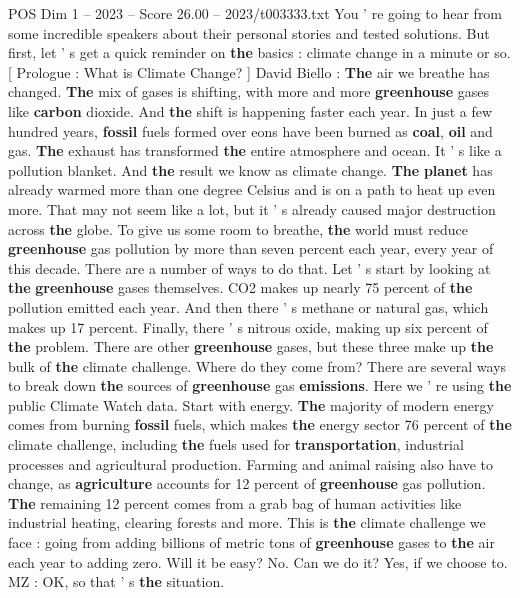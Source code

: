 \begin{textsample}{POS Dim 1 – 2023 – Score 26.00 – 2023/t003333.txt}
You ' re going to hear from some incredible speakers about their personal stories and tested solutions.
But first, let ' s get a quick reminder on \textbf{the} basics : climate change in a minute or so. [ Prologue : What is Climate Change? ] David Biello : \textbf{The} air we breathe has changed. \textbf{The} mix of gases is shifting, with more and more \textbf{greenhouse} gases like \textbf{carbon} dioxide.
And \textbf{the} shift is happening faster each year.
In just a few hundred years, \textbf{fossil} fuels formed over eons have been burned as \textbf{coal}, \textbf{oil} and gas. \textbf{The} exhaust has transformed \textbf{the} entire atmosphere and ocean.
It ' s like a pollution blanket.
And \textbf{the} result we know as climate change. \textbf{The} \textbf{planet} has already warmed more than one degree Celsius and is on a path to heat up even more.
That may not seem like a lot, but it ' s already caused major destruction across \textbf{the} globe.
To give us some room to breathe, \textbf{the} world must reduce \textbf{greenhouse} gas pollution by more than seven percent each year, every year of this decade.
There are a number of ways to do that.
Let ' s start by looking at \textbf{the} \textbf{greenhouse} gases themselves.
CO2 makes up nearly 75 percent of \textbf{the} pollution emitted each year.
And then there ' s methane or natural gas, which makes up 17 percent.
Finally, there ' s nitrous oxide, making up six percent of \textbf{the} problem.
There are other \textbf{greenhouse} gases, but these three make up \textbf{the} bulk of \textbf{the} climate challenge.
Where do they come from?
There are several ways to break down \textbf{the} sources of \textbf{greenhouse} gas \textbf{emissions}.
Here we ' re using \textbf{the} public Climate Watch data.
Start with energy. \textbf{The} majority of modern energy comes from burning \textbf{fossil} fuels, which makes \textbf{the} energy sector 76 percent of \textbf{the} climate challenge, including \textbf{the} fuels used for \textbf{transportation}, industrial processes and agricultural production.
Farming and animal raising also have to change, as \textbf{agriculture} accounts for 12 percent of \textbf{greenhouse} gas pollution. \textbf{The} remaining 12 percent comes from a grab bag of human activities like industrial heating, clearing forests and more.
This is \textbf{the} climate challenge we face : going from adding billions of metric tons of \textbf{greenhouse} gases to \textbf{the} air each year to adding zero.
Will it be easy?
No.
Can we do it?
Yes, if we choose to.
MZ : OK, so that ' s \textbf{the} situation.

\end{textsample}
